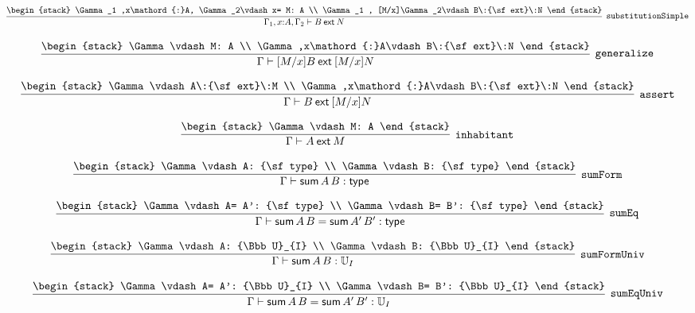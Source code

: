 \[
\infer[{\tt substitutionSimple}]{\Gamma_1 ,x\mathord{:}A, \Gamma_2 \vdash B\:{\sf ext}\:N}{
\begin{stack}
\Gamma_1 ,x\mathord{:}A, \Gamma_2\vdash x= M: A
\\
\Gamma_1 , [M/x]\Gamma_2\vdash B\:{\sf ext}\:N
\end{stack}}
\]

\[
\infer[{\tt generalize}]{\Gamma \vdash [M/x]B\:{\sf ext}\:[M/x]N}{
\begin{stack}
\Gamma \vdash M: A
\\
\Gamma ,x\mathord{:}A\vdash B\:{\sf ext}\:N
\end{stack}}
\]

\[
\infer[{\tt assert}]{\Gamma \vdash B\:{\sf ext}\:[M/x]N}{
\begin{stack}
\Gamma \vdash A\:{\sf ext}\:M
\\
\Gamma ,x\mathord{:}A\vdash B\:{\sf ext}\:N
\end{stack}}
\]

\[
\infer[{\tt inhabitant}]{\Gamma \vdash A\:{\sf ext}\:M}{
\begin{stack}
\Gamma \vdash M: A
\end{stack}}
\]

\[
\infer[{\tt sumForm}]{\Gamma \vdash {\sf sum}\,A\,B: {\sf type}}{
\begin{stack}
\Gamma \vdash A: {\sf type}
\\
\Gamma \vdash B: {\sf type}
\end{stack}}
\]

\[
\infer[{\tt sumEq}]{\Gamma \vdash {\sf sum}\,A\,B= {\sf sum}\,A'\,B': {\sf type}}{
\begin{stack}
\Gamma \vdash A= A': {\sf type}
\\
\Gamma \vdash B= B': {\sf type}
\end{stack}}
\]

\[
\infer[{\tt sumFormUniv}]{\Gamma \vdash {\sf sum}\,A\,B: {\Bbb U}_{I}}{
\begin{stack}
\Gamma \vdash A: {\Bbb U}_{I}
\\
\Gamma \vdash B: {\Bbb U}_{I}
\end{stack}}
\]

\[
\infer[{\tt sumEqUniv}]{\Gamma \vdash {\sf sum}\,A\,B= {\sf sum}\,A'\,B': {\Bbb U}_{I}}{
\begin{stack}
\Gamma \vdash A= A': {\Bbb U}_{I}
\\
\Gamma \vdash B= B': {\Bbb U}_{I}
\end{stack}}
\]

